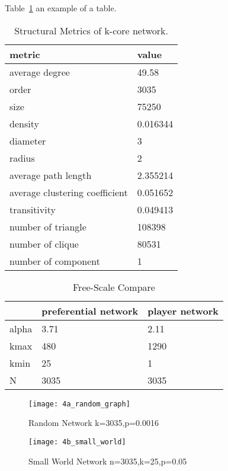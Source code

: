 \documentclass[runningheads]{llncs}
\begin{document}
Table~\ref{tab_prefere_attach} an example of a table.

\begin{table}
\caption{Structural Metrics of k-core network.}\label{tab_prefere_attach}
\begin{tabular}{|l|l|}
\hline
metric & value \\
\hline
average degree & 49.58 \\
order & 3035 \\
size & 75250 \\
density & 0.016344 \\
diameter & 3 \\
radius & 2 \\
average path length & 2.355214 \\
average clustering coefficient & 0.051652 \\
transitivity & 0.049413 \\
number of triangle & 108398 \\ 
number of clique & 80531 \\
number of component & 1 \\
\end{tabular}
\end{table}


\begin{table}
\centering
\caption{Free-Scale Compare} \label{tab_free_scale_compare}
\begin{tabular}{|l|l|l|}
\hline
& preferential network & player network \\ \hline
alpha & 3.71 & 2.11 \\ 
kmax & 480 & 1290 \\ 
kmin & 25 & 1 \\ 
N & 3035 & 3035 \\ \hline

\end{tabular}
\end{table}


\begin{figure}
\texttt{[image: 4a\_random\_graph]}

\caption{Random Network k=3035,p=0.0016} \label{fig_4a_random_graph}
\end{figure}

\begin{figure}
\texttt{[image: 4b\_small\_world]}
\caption{Small World Network n=3035,k=25,p=0.05} \label{fig_4_smallworld}
\end{figure}
\end{document}
